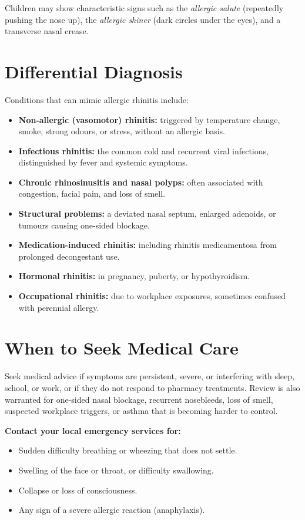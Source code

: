Children may show characteristic signs such as the \emph{allergic salute} (repeatedly pushing the nose up), the \emph{allergic shiner} (dark circles under the eyes), and a transverse nasal crease.

\section*{Differential Diagnosis}
Conditions that can mimic allergic rhinitis include:

\begin{itemize}
    \item \textbf{Non-allergic (vasomotor) rhinitis:} triggered by temperature change, smoke, strong odours, or stress, without an allergic basis.
    \item \textbf{Infectious rhinitis:} the common cold and recurrent viral infections, distinguished by fever and systemic symptoms.
    \item \textbf{Chronic rhinosinusitis and nasal polyps:} often associated with congestion, facial pain, and loss of smell.
    \item \textbf{Structural problems:} a deviated nasal septum, enlarged adenoids, or tumours causing one-sided blockage.
    \item \textbf{Medication-induced rhinitis:} including rhinitis medicamentosa from prolonged decongestant use.
    \item \textbf{Hormonal rhinitis:} in pregnancy, puberty, or hypothyroidism.
    \item \textbf{Occupational rhinitis:} due to workplace exposures, sometimes confused with perennial allergy.
\end{itemize}

\section*{When to Seek Medical Care}
Seek medical advice if symptoms are persistent, severe, or interfering with sleep, school, or work, or if they do not respond to pharmacy treatments. Review is also warranted for one-sided nasal blockage, recurrent nosebleeds, loss of smell, suspected workplace triggers, or asthma that is becoming harder to control.

\textbf{Contact your local emergency services for:}
\begin{itemize}
    \item Sudden difficulty breathing or wheezing that does not settle.
    \item Swelling of the face or throat, or difficulty swallowing.
    \item Collapse or loss of consciousness.
    \item Any sign of a severe allergic reaction (anaphylaxis).
\end{itemize}

